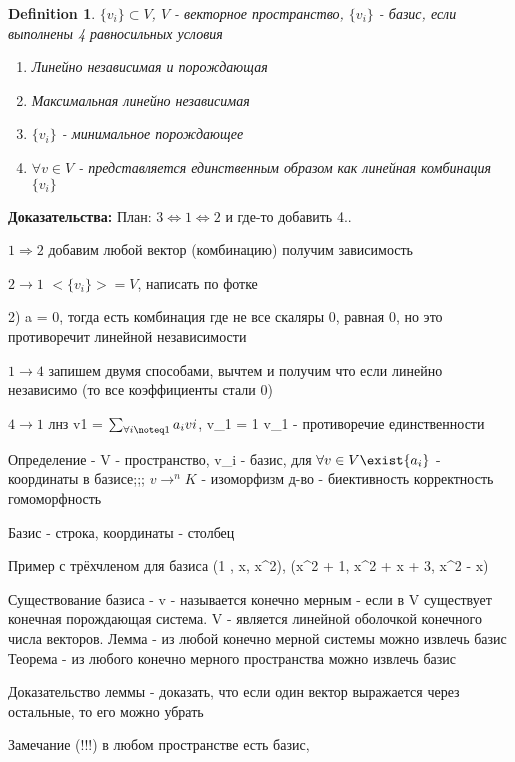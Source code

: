 \documentclass[12pt]{article}
\newtheorem{definition}{Definition}
\begin{document}
\begin{definition}
    $\{v_i\} \subset V$, $V$ - векторное пространство, $\{v_i\}$ - базис, если выполнены 4 равносильных условия
    \begin{enumerate}
        \item Линейно независимая и порождающая
        \item Максимальная линейно независимая
        \item $\{v_i\}$ - минимальное порождающее
        \item $\forall v \in V$ - представляется единственным образом как линейная комбинация $\{v_i\}$ 
    \end{enumerate}

\end{definition} 

\textbf{Доказательства:} План: $3 \Leftrightarrow 1 \Leftrightarrow 2$ и где-то добавить 4..

$1 \Rightarrow 2$ добавим любой вектор (комбинацию) получим зависимость

$2 \rightarrow 1$ $<\{v_i\}> = V$, написать по фотке

2) a = 0, тогда есть комбинация где не все скаляры 0, равная 0, но это противоречит линейной независимости 

$1 \rightarrow 4$ запишем двумя способами, вычтем и получим  что если линейно независимо (то все коэффициенты стали 0)

$4 \rightarrow 1$ лнз v1 = $\sum_{\forall i \noteq 1} {a_ivi}$, v_1 = 1 v_1 - противоречие единственности 


Определение - V - пространство, {v_i} - базис, для $\forall v \in V \exist {a_i}$ - координаты в базисе;;; $v \rightarrow ^nK$ - изоморфизм
д-во - биективность корректность гомоморфность 

Базис - строка, координаты - столбец

Пример с трёхчленом для базиса (1 , x, x^2), (x^2 + 1, x^2 + x + 3, x^2 - x) 


Существование базиса - v - называется конечно мерным - если в V существует конечная порождающая система. V - является линейной оболочкой конечного числа векторов.
Лемма - из любой конечно мерной системы можно извлечь базис
Теорема - из любого конечно мерного пространства можно извлечь базис

Доказательство леммы - доказать, что если один вектор выражается через остальные, то его можно убрать

Замечание (!!!) в любом пространстве есть базис, 
\end{document}
